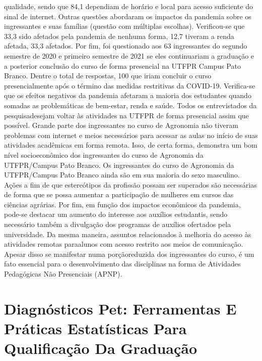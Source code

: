 qualidade, sendo que 84,1%
dependiam de horário e local para acesso suficiente do sinal de internet.
Outras questões abordaram os impactos da pandemia sobre os ingressantes e suas famílias
(questão com múltiplas escolhas). Verificou-se que 33,3%
sido afetados pela pandemia de nenhuma forma, 12,7%
tiveram a renda afetada, 33,3%
afetados. Por fim, foi questionado aos 63 ingressantes do segundo semestre de 2020 e primeiro 
semestre de 2021 se eles continuariam a graduação e a posterior conclusão do curso de forma 
presencial na UTFPR Campus Pato Branco. Dentre o total de respostas, 100%
que iriam concluir o curso presencialmente após o término das medidas restritivas da COVID-19. 
Verifica-se que os efeitos negativos da pandemia afetaram a maioria dos estudantes quando
somadas as problemáticas de bem-estar, renda e saúde. Todos os entrevistados da pesquisadesejam
voltar às atividades na UTFPR de forma presencial assim que possível. Grande parte dos
ingressantes no curso de Agronomia não tiveram problemas com internet e meios necessários para
acessar as aulas no início de suas atividades acadêmicas em forma remota. Isso, de certa forma,
demonstra um bom nível socioeconômico dos ingressantes do curso de Agronomia da
UTFPR/Campus Pato Branco.
Os ingressantes do curso de Agronomia da UTFPR/Campus Pato Branco ainda são em sua
maioria do sexo masculino. Ações a fim de que estereótipos da profissão possam ser superados
são necessárias de forma que se possa aumentar a participação de mulheres em cursos das ciências
agrárias. Por fim, em função dos impactos econômicos da pandemia, pode-se destacar um aumento
do interesse aos auxílios estudantis, sendo necessário também a divulgação dos programas de
auxílios ofertados pela universidade. Da mesma maneira, assuntos relacionados à melhoria do
acesso às atividades remotas paraalunos com acesso restrito aos meios de comunicação. Apesar 
disso se manifestar numa porçãoreduzida dos ingressantes do curso, é um fato essencial para o 
desenvolvimento das disciplinas na forma de Atividades Pedagógicas Não Presenciais (APNP).




\section*{Diagnósticos Pet: Ferramentas E Práticas Estatísticas Para Qualificação Da Graduação}

